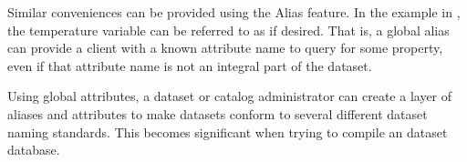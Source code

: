 Similar conveniences can be provided using the Alias feature.  In the
example in , the temperature variable
can be referred to as  if desired.  That is, a
global alias can provide a client with a known attribute name to query
for some property, even if that attribute name is not an integral part
of the dataset.

Using global attributes, a dataset or catalog administrator can create
a layer of aliases and attributes to make \opendap datasets conform to
several different dataset naming standards.  This becomes significant
when trying to compile an \opendap dataset database.


%
%
%
%



